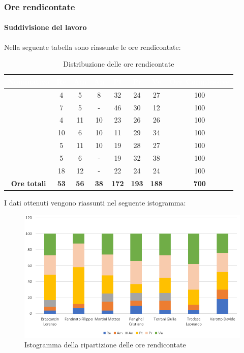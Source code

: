 \subsubsection{Ore rendicontate}
\paragraph{Suddivisione del lavoro}
Nella seguente tabella sono riassunte le ore rendicontate:
\begin{table}[H]
	\begin{center}
		\begin{tabular}{ |c c c c c c c c| }
		\rowcolor{darkblue} 
		\textcolor{white}{\textbf{Nominativo}} & \textcolor{white}{\textbf{Re}} & \textcolor{white}{\textbf{Am}} & \textcolor{white}{\textbf{An}} & \textcolor{white}{\textbf{Pt}} & \textcolor{white}{\textbf{Pr}} & \textcolor{white}{\textbf{Ve}} & \textcolor{white}{\textbf{Ore Complessive}} \\ \hline
		\BL 	& 4  	& 5  	& 8 	& 32 	& 24 	& 27 	& 100 \\ \hline
		\FF 	& 7 	& 5 	& -		& 46 	& 30 	& 12 	& 100 \\ \hline
		\MM 	& 4  	& 11  	& 10 	& 23 	& 26 	& 26  	& 100 \\ \hline
		\PC 	& 10 	& 6  	& 10	& 11 	& 29	& 34 	& 100 \\ \hline
		\TG 	& 5  	& 11 	& 10 	& 19 	& 28 	& 27 	& 100 \\ \hline
		\TL 	& 5  	& 6 	& - 	& 19 	& 32 	& 38 	& 100 \\ \hline
		\VD 	& 18  	& 12  	& -	& 22 	& 24 	& 24 	& 100 \\ \hline
		\textbf{Ore totali} & \textbf{53} & \textbf{56} & \textbf{38} & \textbf{172} & \textbf{193} & \textbf{188} & \textbf{700} \\ \hline
		\end{tabular}
	\caption{Distribuzione delle ore rendicontate}
	\end{center}
\end{table}
I dati ottenuti vengono riassunti nel seguente istogramma:
\begin{figure}[H]
    \centering
    \includegraphics[scale = 0.70]{Immagini/TotaleRendicontatoIsto.png}
    \caption{Istogramma della ripartizione delle ore rendicontate}
    \label{fig:Istogramma ripartizione ore totali rendicontate}
\end{figure}
\newpage

